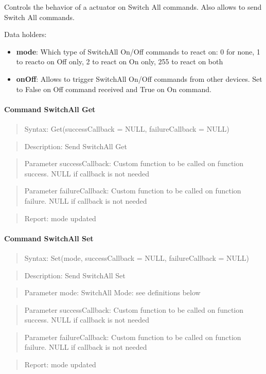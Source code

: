 Controls the behavior of a actuator on Switch All commands. Also allows to send Switch All commands.
\newline

\noindent
Data holders:

\begin{itemize}
\item \textbf{mode}: Which type of SwitchAll On/Off commands to react on: 0 for none, 1 to reacto on Off only, 2 to react on On only, 255 to react on both
\item \textbf{onOff}: Allows to trigger SwitchAll On/Off commands from other devices. Set to False on Off command received and True on On command.
\end{itemize}

\paragraph{Command SwitchAll Get}
\begin{quote}Syntax: Get(successCallback = NULL, failureCallback = NULL)\end{quote}
\begin{quote}Description: Send SwitchAll Get\end{quote}
\begin{quote}Parameter successCallback: Custom function to be called on function success. NULL if callback is not needed\end{quote}
\begin{quote}Parameter failureCallback: Custom function to be called on function failure. NULL if callback is not needed\end{quote}
\begin{quote}Report: mode updated\end{quote}

\paragraph{Command SwitchAll Set}
\begin{quote}Syntax: Set(mode, successCallback = NULL, failureCallback = NULL)\end{quote}
\begin{quote}Description: Send SwitchAll Set\end{quote}
\begin{quote}Parameter mode: SwitchAll Mode: see definitions below\end{quote}
\begin{quote}Parameter successCallback: Custom function to be called on function success. NULL if callback is not needed\end{quote}
\begin{quote}Parameter failureCallback: Custom function to be called on function failure. NULL if callback is not needed\end{quote}
\begin{quote}Report: mode updated\end{quote}

